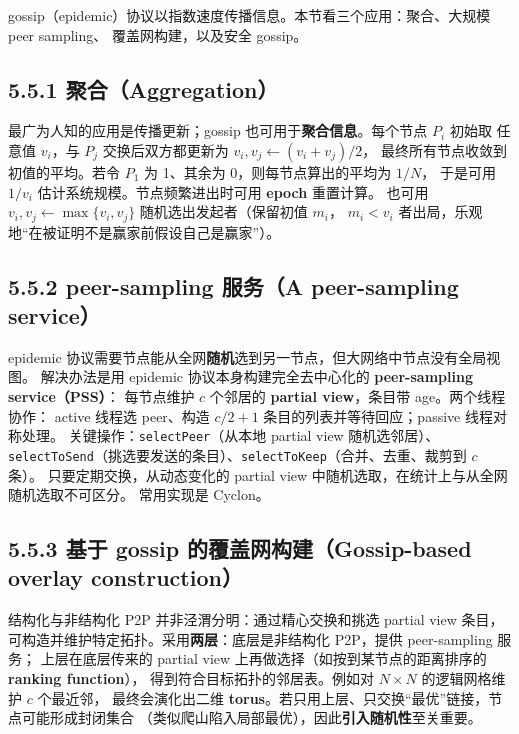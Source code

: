 

gossip（epidemic）协议以指数速度传播信息。本节看三个应用：聚合、大规模 peer sampling、
覆盖网构建，以及安全 gossip。

\subsection*{5.5.1 聚合（Aggregation）}
最广为人知的应用是传播更新；gossip 也可用于\textbf{聚合信息}。每个节点 $P_i$ 初始取
任意值 $v_i$，与 $P_j$ 交换后双方都更新为 $v_i, v_j \leftarrow (v_i+v_j)/2$，
最终所有节点收敛到初值的平均。若令 $P_1$ 为 1、其余为 0，则每节点算出的平均为 $1/N$，
于是可用 $1/v_i$ 估计系统规模。节点频繁进出时可用 \textbf{epoch} 重置计算。
也可用 $v_i, v_j \leftarrow \max\{v_i, v_j\}$ 随机选出发起者（保留初值 $m_i$，
$m_i < v_i$ 者出局，乐观地“在被证明不是赢家前假设自己是赢家”）。

\subsection*{5.5.2 peer-sampling 服务（A peer-sampling service）}
epidemic 协议需要节点能从全网\textbf{随机}选到另一节点，但大网络中节点没有全局视图。
解决办法是用 epidemic 协议本身构建完全去中心化的 \textbf{peer-sampling service（PSS）}：
每节点维护 $c$ 个邻居的 \textbf{partial view}，条目带 age。两个线程协作：
active 线程选 peer、构造 $c/2+1$ 条目的列表并等待回应；passive 线程对称处理。
关键操作：\texttt{selectPeer}（从本地 partial view 随机选邻居）、
\texttt{selectToSend}（挑选要发送的条目）、\texttt{selectToKeep}（合并、去重、裁剪到 $c$ 条）。
只要定期交换，从动态变化的 partial view 中随机选取，在统计上与从全网随机选取不可区分。
常用实现是 Cyclon。

\subsection*{5.5.3 基于 gossip 的覆盖网构建（Gossip-based overlay construction）}
结构化与非结构化 P2P 并非泾渭分明：通过精心交换和挑选 partial view 条目，
可构造并维护特定拓扑。采用\textbf{两层}：底层是非结构化 P2P，提供 peer-sampling 服务；
上层在底层传来的 partial view 上再做选择（如按到某节点的距离排序的 \textbf{ranking function}），
得到符合目标拓扑的邻居表。例如对 $N\times N$ 的逻辑网格维护 $c$ 个最近邻，
最终会演化出二维 \textbf{torus}。若只用上层、只交换“最优”链接，节点可能形成封闭集合
（类似爬山陷入局部最优），因此\textbf{引入随机性}至关重要。

